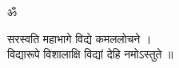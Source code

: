 \begin{center}
	
	{\Large
		\devanagarifont
		ॐ
		
		\vspace{0.7cm}
		
		{\Large
			\devanagarifont
			सरस्वति महाभागे विद्ये कमललोचने ।\\[0.5cm]
			विद्यारूपे विशालाक्षि विद्यां देहि नमोऽस्तुते ॥
		}
	}
	
\end{center}